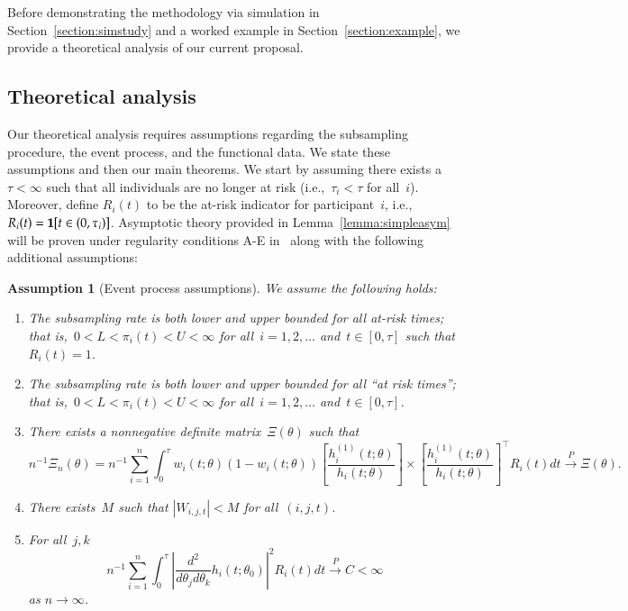 \documentclass[11pt]{amsart}
\newtheorem{assumption}[thm]{Assumption}
\begin{document}
\noindent Before demonstrating the methodology via simulation in Section~\ref{section:simstudy} and a worked example in Section~\ref{section:example}, we provide a theoretical analysis of our current proposal.


\subsection{Theoretical analysis}

Our theoretical analysis requires assumptions regarding the subsampling procedure, the event process, and the functional data. We state these assumptions and then our main theorems. We start by assuming there exists a~$\tau < \infty$ such that all individuals are no longer at risk (i.e.,~$\tau_i < \tau$ for all~$i$). Moreover, define $R_i (t)$ to be the at-risk indicator for participant~$i$, i.e., $R_i (t) = {\bf 1} [t \in (0,\tau_i)]$. Asymptotic theory provided in Lemma~\ref{lemma:simpleasym} will be proven under regularity conditions A-E in~\cite[pp. 420--421]{Andersen1993} along with the following additional assumptions:

\begin{assumption}[Event process assumptions]
\label{assumption:events}\normalfont
We assume the following holds:
\begin{enumerate}[label=(E.\arabic*)]
\item\label{E1} The subsampling rate is both lower and upper bounded for all at-risk times; that is,~$0 < L < \pi_i (t) < U < \infty$ for all~$i=1,2,\ldots$ and~$t \in [0, \tau]$ such that $R_i (t) = 1$.
\item\label{E1} The subsampling rate is both lower and upper bounded for all ``at risk times''; that is,~$0 < L < \pi_i (t) < U < \infty$ for all~$i=1,2,\ldots$ and~$t \in [0,\tau]$.
\item\label{E2} There exists a nonnegative definite matrix~$\Xi (\theta)$ such that
  \[
    n^{-1} \Xi_n (\theta) = n^{-1} \sum_{i=1}^n \int_0^\tau w_i (t;
    \theta) (1 - w_i (t; \theta)) \left[ \frac{h_i^{(1)}(t;
        \theta)}{h_i (t; \theta)} \right] \times  \left [
      \frac{h_i^{(1)} (t;\theta)}{h_i(t; \theta)} \right]^\top R_i (t)
    dt \overset{P}{\to} \Xi (\theta).
  \]
\item\label{E3} There exists~$M$ such that $|W_{i,j,t}| < M$ for all~$(i,j,t)$.
\item\label{E4} For all~$j,k$
\[
n^{-1} \sum_{i=1}^n \int_0^\tau \left | \frac{d^2}{d\theta_j
    d\theta_k} h_i (t;\theta_0) \right|^2 R_i (t) dt \overset{P}{\to}
C < \infty
\]
as $n \to \infty$.
\end{enumerate}
\end{assumption}
\end{document}

